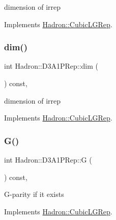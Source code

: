 dimension of irrep 

Implements \mbox{\hyperlink{structHadron_1_1CubicLGRep_a3acbaea26503ed64f20df693a48e4cdd}{Hadron\+::\+Cubic\+L\+G\+Rep}}.

\mbox{\label{structHadron_1_1D3A1PRep_a250e3d75bd0193a38ca00df99dfd1936}} 
\subsubsection{\texorpdfstring{dim()}{dim()}\hspace{0.1cm}{\footnotesize\ttfamily [3/3]}}
{\footnotesize\ttfamily int Hadron\+::\+D3\+A1\+P\+Rep\+::dim (\begin{DoxyParamCaption}{ }\end{DoxyParamCaption}) const\hspace{0.3cm}{\ttfamily [inline]}, {\ttfamily [virtual]}}

dimension of irrep 

Implements \mbox{\hyperlink{structHadron_1_1CubicLGRep_a3acbaea26503ed64f20df693a48e4cdd}{Hadron\+::\+Cubic\+L\+G\+Rep}}.

\mbox{\label{structHadron_1_1D3A1PRep_a5598aa20a6886bf4d30c2610d30e4836}} 
\subsubsection{\texorpdfstring{G()}{G()}\hspace{0.1cm}{\footnotesize\ttfamily [1/3]}}
{\footnotesize\ttfamily int Hadron\+::\+D3\+A1\+P\+Rep\+::G (\begin{DoxyParamCaption}{ }\end{DoxyParamCaption}) const\hspace{0.3cm}{\ttfamily [inline]}, {\ttfamily [virtual]}}

G-\/parity if it exists 

Implements \mbox{\hyperlink{structHadron_1_1CubicLGRep_ace26f7b2d55e3a668a14cb9026da5231}{Hadron\+::\+Cubic\+L\+G\+Rep}}.

\mbox{\label{structHadron_1_1D3A1PRep_a5598aa20a6886bf4d30c2610d30e4836}} 
